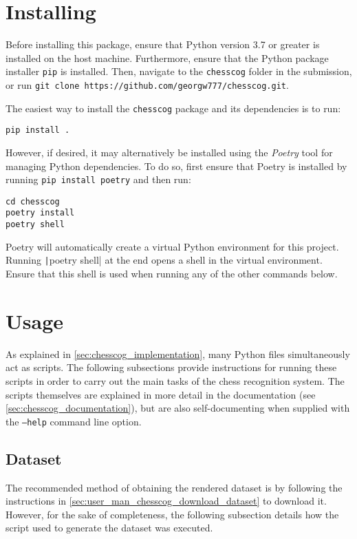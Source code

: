 \documentclass[../../report.tex]{subfiles}
\begin{document}
\section{Installing}
\label{sec:chesscog_installing}
Before installing this package, ensure that Python version 3.7 or greater is installed on the host machine.
Furthermore, ensure that the Python package installer \texttt{pip} is installed.
Then, navigate to the \texttt{chesscog} folder in the submission, or run \texttt{git clone https://github.com/georgw777/chesscog.git}.

The easiest way to install the \texttt{chesscog} package and its dependencies is to run:
\begin{verbatim}
pip install .
\end{verbatim}

However, if desired, it may alternatively be installed using the \emph{Poetry} tool for managing Python dependencies.
To do so, first ensure that Poetry is installed by running \texttt{pip install poetry} and then run:
\begin{verbatim}
cd chesscog
poetry install
poetry shell
\end{verbatim}
Poetry will automatically create a virtual Python environment for this project.
Running \texttt|poetry shell| at the end opens a shell in the virtual environment. 
Ensure that this shell is used when running any of the other commands below.

\section{Usage}

As explained in \cref{sec:chesscog_implementation}, many Python files simultaneously act as scripts.
The following subsections provide instructions for running these scripts in order to carry out the main tasks of the chess recognition system.
The scripts themselves are explained in more detail in the documentation (see \cref{sec:chesscog_documentation}), but are also self-documenting when supplied with the \texttt{--help} command line option.

\subsection{Dataset}
\label{sec:user_man_chesscog_dataset}

The recommended method of obtaining the rendered dataset is by following the instructions in \cref{sec:user_man_chesscog_download_dataset} to download it.
However, for the sake of completeness, the following subsection details how the script used to generate the dataset was executed.
\end{document}
